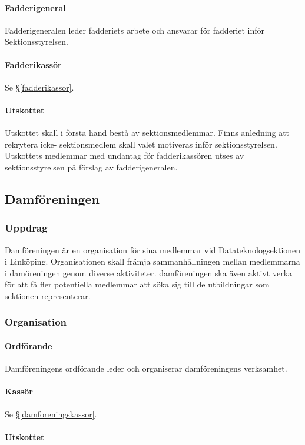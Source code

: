 \documentclass{datateknologsektionen-document}
\begin{document}
\paragraph{Fadderigeneral}
Fadderigeneralen leder fadderiets arbete och ansvarar för fadderiet inför Sektionsstyrelsen.
\paragraph{Fadderikassör}
Se \S \ref{fadderikassor}.
\paragraph{Utskottet}

Utskottet skall i första hand bestå av sektionsmedlemmar. Finns anledning att rekrytera icke-
sektionsmedlem skall valet motiveras inför sektionsstyrelsen. Utskottets medlemmar med
undantag för fadderikassören utses av sektionsstyrelsen på förslag av fadderigeneralen.
\subsection{Damföreningen}
\label{damforeningen}
\subsubsection{Uppdrag}
Damföreningen är en organisation för sina medlemmar vid Datateknologsektionen i Linköping.
Organisationen skall främja sammanhållningen mellan medlemmarna i damöreningen genom
diverse aktiviteter. damföreningen ska även aktivt verka för att få fler potentiella medlemmar
att söka sig till de utbildningar som sektionen representerar.

\subsubsection{Organisation}
\paragraph{Ordförande}
Damföreningens ordförande leder och organiserar damföreningens verksamhet.
\paragraph{Kassör}
Se \S \ref{damforeningskassor}.
\paragraph{Utskottet}
\end{document}
